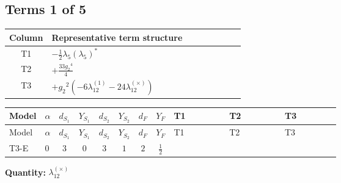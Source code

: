 \documentclass[8pt]{article}
\begin{document}
\begin{landscape}
\subsection*{Terms 1 of 5}
\begin{center}
\begin{tabular}{@{}c >{\raggedright\arraybackslash}p{0.82\linewidth}@{}}
\toprule
Column & Representative term structure \\
\midrule
T1 & \(\displaystyle -\frac{1}{2} {\lambda_5} \left({\lambda_5}\right)^{*}\) \\
\midrule
T2 & \(\displaystyle +\frac{33 {g_2}^4}{4}\) \\
\midrule
T3 & \(\displaystyle +{g_2}^2 (-6 {\lambda_{12}^{(1)}}-24 {\lambda_{12}^{(\times)}})\) \\
\midrule
\bottomrule
\end{tabular}
\end{center}
\smallskip
\tiny
\begin{longtable}{@{}llcccccc >{\raggedright\arraybackslash}p{0.21\linewidth} >{\raggedright\arraybackslash}p{0.21\linewidth} >{\raggedright\arraybackslash}p{0.21\linewidth}@{}}
\toprule
Model & $\alpha$ & $d_{S_1}$ & $Y_{S_1}$ & $d_{S_2}$ & $Y_{S_2}$ & $d_F$ & $Y_F$ & T1 & T2 & T3 \\
\midrule
\endfirsthead
\toprule
Model & $\alpha$ & $d_{S_1}$ & $Y_{S_1}$ & $d_{S_2}$ & $Y_{S_2}$ & $d_F$ & $Y_F$ & T1 & T2 & T3 \\
\midrule
\endhead
T3-E & $0$ & $3$ & $0$ & $3$ & $1$ & $2$ & $\frac{1}{2}$ & \scriptsize\adjustbox{max width=\linewidth}{$\begin{gathered} -\frac{1}{2} {\lambda_5} \left({\lambda_5}\right)^{*}\end{gathered}$} & \scriptsize\adjustbox{max width=\linewidth}{$\begin{gathered} +\frac{33 {g_2}^4}{4}\end{gathered}$} & \scriptsize\adjustbox{max width=\linewidth}{$\begin{gathered} +{g_2}^2 (-6 {\lambda_{12}^{(1)}}-24 {\lambda_{12}^{(\times)}})\end{gathered}$} \\
\midrule
\bottomrule
\end{longtable}
\clearpage
\noindent\textbf{Quantity: }$\lambda_{12}^{(\times)}$\par\smallskip

\end{landscape}
\end{document}
